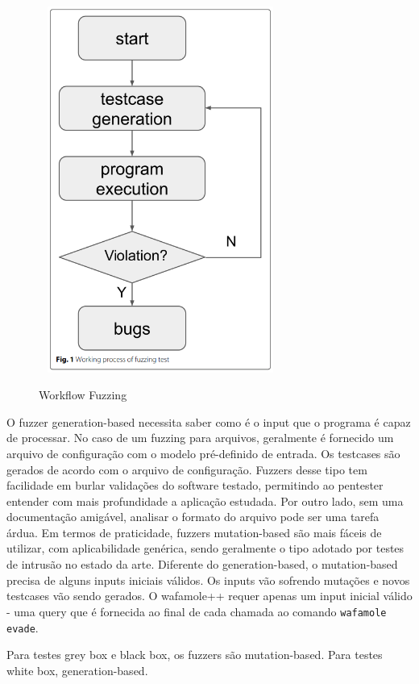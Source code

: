\begin{figure}[ht]
    \centering
    \caption{Workflow Fuzzing}
    \includegraphics[width=8cm,height=12cm,keepaspectratio]{figuras/fuzzing imagem.png} 
    \label{fig:internet} 
\end{figure}

O fuzzer generation-based necessita saber como é o input que o programa é capaz de processar. No caso de um fuzzing para arquivos, geralmente é fornecido um arquivo de configuração com o modelo pré-definido de entrada. Os testcases são gerados de acordo com o arquivo de configuração. Fuzzers desse tipo tem facilidade em burlar validações do software testado, permitindo ao pentester entender com mais profundidade a aplicação estudada. Por outro lado, sem uma documentação amigável, analisar o formato do arquivo pode ser uma tarefa árdua.
Em termos de praticidade, fuzzers mutation-based são mais fáceis de utilizar, com aplicabilidade genérica, sendo geralmente o tipo adotado por testes de intrusão no estado da arte. Diferente do generation-based, o mutation-based precisa de alguns inputs iniciais válidos. Os inputs vão sofrendo mutações e novos testcases vão sendo gerados. O wafamole++ requer apenas um input inicial válido - uma query que é fornecida ao final de cada chamada ao comando \verb+wafamole evade+.

Para testes grey box e black box, os fuzzers são mutation-based. Para testes white box, generation-based.

